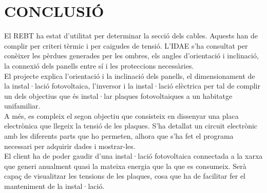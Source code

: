 \chapter{\uppercase{Conclusió}}

El REBT ha estat d'utilitat per determinar la secció dels cables. Aquests han de complir per criteri tèrmic i per caigudes de tensió. L'IDAE s'ha consultat per conèixer les pèrdues generades per les ombres, els angles d'orientació i inclinació, la connexió dels panells entre sí i les proteccions necessàries.\\
%
\newline El projecte explica l'orientació i la inclinació dels panells, el dimensionament de la instal·lació fotovoltaica, l'inversor i la instal·lació elèctrica per tal de complir un dels objectius que és instal·lar plaques fotovoltaiques a un habitatge unifamiliar.\\
\newline A més, es compleix el segon objectiu que consisteix en dissenyar una placa electrònica que llegeix la tensió de les plaques. S'ha detallat un circuit electrònic amb les diferents parts que ho permeten, alhora que s'ha fet el programa necessari per adquirir dades i mostrar-les.\\
%
\newline El client ha de poder gaudir d'una instal·lació fotovoltaica connectada a la xarxa que generi anualment quasi la mateixa energia que la que es consumeix. Serà capaç de visualitzar les tensions de les plaques, cosa que ha de facilitar fer el manteniment de la instal·lació.\\



\clearpage